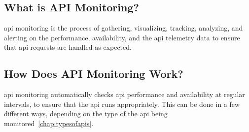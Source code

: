 \begin{multicols}{2}
      \subsection{What is API Monitoring?}
      \acrshort{api} monitoring is the process of gathering, visualizing, tracking, analyzing, and alerting on the 
      performance, availability, and the \acrshort{api} telemetry data to ensure that \acrshort{api} requests are 
      handled as expected. 
      \subsection{How Does API Monitoring Work?}
      \acrshort{api} monitoring automatically checks \acrshort{api} performance and availability at regular intervals,
      to ensure that the \acrshort{api} runs appropriately. This can be done in a few different ways, depending on the
      type of the \acrshort{api} being monitored~\ref{chap:typesofapis}.


\end{multicols}
